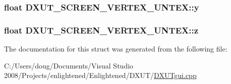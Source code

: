 \label{struct_d_x_u_t___s_c_r_e_e_n___v_e_r_t_e_x___u_n_t_e_x_a8385e54d50531a96114e6c2e1de0a2c3}
\hypertarget{struct_d_x_u_t___s_c_r_e_e_n___v_e_r_t_e_x___u_n_t_e_x_a7dba6abd9d324dd56538daabdaa21fe6}{
\subsubsection[{y}]{\setlength{\rightskip}{0pt plus 5cm}float {\bf DXUT\_\-SCREEN\_\-VERTEX\_\-UNTEX::y}}}
\label{struct_d_x_u_t___s_c_r_e_e_n___v_e_r_t_e_x___u_n_t_e_x_a7dba6abd9d324dd56538daabdaa21fe6}
\hypertarget{struct_d_x_u_t___s_c_r_e_e_n___v_e_r_t_e_x___u_n_t_e_x_a7289e8e6f39d6c0a89fa299431b4408d}{
\subsubsection[{z}]{\setlength{\rightskip}{0pt plus 5cm}float {\bf DXUT\_\-SCREEN\_\-VERTEX\_\-UNTEX::z}}}
\label{struct_d_x_u_t___s_c_r_e_e_n___v_e_r_t_e_x___u_n_t_e_x_a7289e8e6f39d6c0a89fa299431b4408d}


The documentation for this struct was generated from the following file:\begin{DoxyCompactItemize}
\item 
C:/Users/doug/Documents/Visual Studio 2008/Projects/enlightened/Enlightened/DXUT/\hyperlink{_d_x_u_tgui_8cpp}{DXUTgui.cpp}\end{DoxyCompactItemize}
